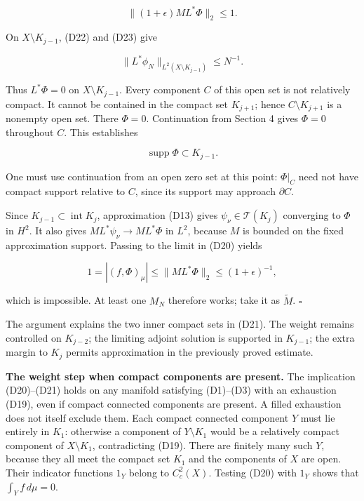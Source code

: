 \documentclass[
  11pt,
]{article}
\begin{document}
\[
                     \|(1+\epsilon)ML^*\Phi\|_2\leq1.          \tag{D24}
\]

On \(X\setminus K_{j-1}\), (D22) and (D23) give

\[
           \|L^*\phi_N\|_{L^2(X\setminus K_{j-1})}\leq N^{-1}.
                                                                    \tag{D25}
\]

Thus \(L^*\Phi=0\) on \(X\setminus K_{j-1}\). Every component \(C\) of
this open set is not relatively compact. It cannot be contained in the
compact set \(K_{j+1}\); hence \(C\setminus K_{j+1}\) is a nonempty open
set. There \(\Phi=0\). Continuation from Section 4 gives \(\Phi=0\)
throughout \(C\). This establishes

\[
                         \operatorname{supp}\Phi\subset K_{j-1}.
                                                                    \tag{D26}
\]

One must use continuation from an open zero set at this point:
\(\Phi|_C\) need not have compact support relative to \(C\), since its
support may approach \(\partial C\).

Since \(K_{j-1}\subset\operatorname{int}K_j\), approximation (D13) gives
\(\psi_\nu\in\mathcal T(K_j)\) converging to \(\Phi\) in \(H^2\). It
also gives \(ML^*\psi_\nu\to ML^*\Phi\) in \(L^2\), because \(M\) is
bounded on the fixed approximation support. Passing to the limit in
(D20) yields

\[
                 1=|(f,\Phi)_\mu|\leq\|ML^*\Phi\|_2
                                      \leq(1+\epsilon)^{-1},    \tag{D27}
\]

which is impossible. At least one \(M_N\) therefore works; take it as
\(\widetilde M\). \(\square\)

The argument explains the two inner compact sets in (D21). The weight
remains controlled on \(K_{j-2}\); the limiting adjoint solution is
supported in \(K_{j-1}\); the extra margin to \(K_j\) permits
approximation in the previously proved estimate.

\textbf{The weight step when compact components are present.} The
implication (D20)--(D21) holds on any manifold satisfying (D1)--(D3)
with an exhaustion (D19), even if compact connected components are
present. A filled exhaustion does not itself exclude them. Each compact
connected component \(Y\) must lie entirely in \(K_1\): otherwise a
component of \(Y\setminus K_1\) would be a relatively compact component
of \(X\setminus K_1\), contradicting (D19). There are finitely many such
\(Y\), because they all meet the compact set \(K_1\) and the components
of \(X\) are open. Their indicator functions \(1_Y\) belong to
\(C_c^2(X)\). Testing (D20) with \(1_Y\) shows that
\(\int_Y f\,d\mu=0\).
\end{document}
